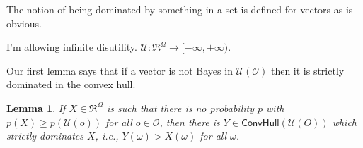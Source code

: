 \documentclass[a4paper]{article}
\newtheorem{lemma}[theorem]{Lemma}
\renewcommand\O{\mathcal{O}}
\newcommand\Uwald{\mathcal{U}} %
\newcommand{\Conv}{\mathsf{ConvHull}}
\renewcommand{\geq}{\geqslant}
\newenvironment{CCM rewritten}
{\begingroup\color{blue}} %
{\endgroup}              %
\begin{document}
	The notion of being dominated by something in a set is defined for vectors as is obvious. 
	
	\begin{infversion}
		I'm allowing infinite disutility. $\Uwald:\Re^\Omega\to[-\infty,+\infty)$. 
	\end{infversion}
	
	Our first lemma says that if a vector is not Bayes in $\Uwald(\O)$ then it is strictly dominated in the convex hull.
	\begin{lemma}\label{thm:cct:admiss in conv are Bayes in conv}
		If $X\in\Re^\Omega$ is such that there is no probability $p$ with $p(X)\geq p(\Uwald(o))$ for all $o\in\O$, then there is $Y\in\Conv(\Uwald(O))$ which strictly dominates $X$, i.e., $Y(\omega)>X(\omega)$ for all $\omega$.
	\end{lemma}
\end{document}
